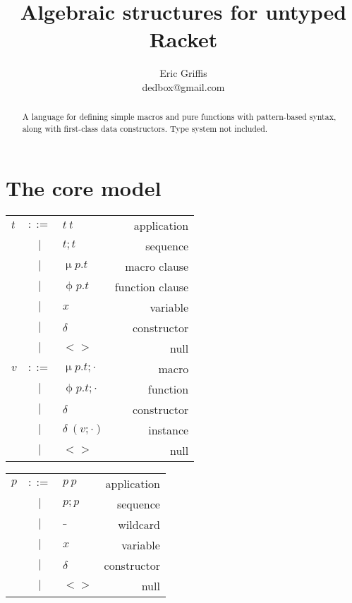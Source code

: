 \documentclass[letterpaper,12pt]{article}
\title{Algebraic structures for untyped Racket}
\author{Eric Griffis \\ dedbox@gmail.com}
\makeatletter
\newenvironment{Grammar}
{
  \begin{tabular*}{\linewidth}{
    >{$}l<{$}
    >{$}c<{$}
    >{$}l<{$}
    @{\extracolsep{\fill}}
    r}
}{
  \end{tabular*}
}
\newcommand\OR{\ensuremath{~|~}}
\def\Mac{\upmu}
\def\Fun{\upphi}
\def\Con{\delta}
\makeatother
\begin{document}
\maketitle

\begin{abstract}
  A language for defining simple macros and pure functions with pattern-based
  syntax, along with first-class data constructors. Type system not included.
\end{abstract}

\section{The core model}
\label{sec:core-model}

\begin{minipage}[t]{0.45\linewidth}
  \vspace{0pt}
  \begin{Grammar}
    t
    & ::= & t~t      & application     \\
    & \OR & t;t      & sequence        \\
    & \OR & \Mac p.t & macro clause    \\
    & \OR & \Fun p.t & function clause \\
    & \OR & x        & variable        \\
    & \OR & \Con     & constructor     \\
    & \OR & <>       & null            \\
    v
    & ::= & \Mac p.t;\cdot & macro       \\
    & \OR & \Fun p.t;\cdot & function    \\
    & \OR & \Con           & constructor \\
    & \OR & \Con~(v;\cdot) & instance    \\
    & \OR & <>             & null        \\
  \end{Grammar}
\end{minipage}
\hfill
\begin{minipage}[t]{0.45\linewidth}
  \vspace{0pt}
  \begin{Grammar}
    p
    & ::= & p~p  & application \\
    & \OR & p;p  & sequence    \\
    & \OR & \_   & wildcard    \\
    & \OR & x    & variable    \\
    & \OR & \Con & constructor \\
    & \OR & <>   & null        \\
  \end{Grammar}
\end{minipage}
\end{document}
